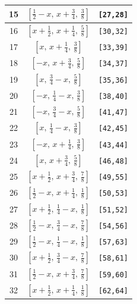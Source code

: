 \documentclass[fleqn,8pt]{jsarticle}
\begin{document}
\begin{longtable}{ccc}
15 & $\left[ \frac{1}{2} - x,\, x + \frac{3}{4},\, \frac{3}{8} \right]$ & {\tt [27,28]} \\ \hline
16 & $\left[ x + \frac{1}{2},\, x + \frac{1}{4},\, \frac{5}{8} \right]$ & {\tt [30,32]} \\ \hline
17 & $\left[ x,\, x + \frac{1}{4},\, \frac{3}{8} \right]$ & {\tt [33,39]} \\ \hline
18 & $\left[ - x,\, x + \frac{3}{4},\, \frac{5}{8} \right]$ & {\tt [34,37]} \\ \hline
19 & $\left[ x,\, \frac{3}{4} - x,\, \frac{5}{8} \right]$ & {\tt [35,36]} \\ \hline
20 & $\left[ - x,\, \frac{1}{4} - x,\, \frac{3}{8} \right]$ & {\tt [38,40]} \\ \hline
21 & $\left[ - x,\, \frac{3}{4} - x,\, \frac{5}{8} \right]$ & {\tt [41,47]} \\ \hline
22 & $\left[ x,\, \frac{1}{4} - x,\, \frac{3}{8} \right]$ & {\tt [42,45]} \\ \hline
23 & $\left[ - x,\, x + \frac{1}{4},\, \frac{3}{8} \right]$ & {\tt [43,44]} \\ \hline
24 & $\left[ x,\, x + \frac{3}{4},\, \frac{5}{8} \right]$ & {\tt [46,48]} \\ \hline
25 & $\left[ x + \frac{1}{2},\, x + \frac{3}{4},\, \frac{7}{8} \right]$ & {\tt [49,55]} \\ \hline
26 & $\left[ \frac{1}{2} - x,\, x + \frac{1}{4},\, \frac{1}{8} \right]$ & {\tt [50,53]} \\ \hline
27 & $\left[ x + \frac{1}{2},\, \frac{1}{4} - x,\, \frac{1}{8} \right]$ & {\tt [51,52]} \\ \hline
28 & $\left[ \frac{1}{2} - x,\, \frac{3}{4} - x,\, \frac{7}{8} \right]$ & {\tt [54,56]} \\ \hline
29 & $\left[ \frac{1}{2} - x,\, \frac{1}{4} - x,\, \frac{1}{8} \right]$ & {\tt [57,63]} \\ \hline
30 & $\left[ x + \frac{1}{2},\, \frac{3}{4} - x,\, \frac{7}{8} \right]$ & {\tt [58,61]} \\ \hline
31 & $\left[ \frac{1}{2} - x,\, x + \frac{3}{4},\, \frac{7}{8} \right]$ & {\tt [59,60]} \\ \hline
32 & $\left[ x + \frac{1}{2},\, x + \frac{1}{4},\, \frac{1}{8} \right]$ & {\tt [62,64]} \\
\end{longtable}
\renewcommand{\arraystretch}{1.2}
\end{document}
